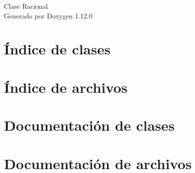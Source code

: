 \documentclass[twoside]{book}
\newcommand{\+}{\discretionary{\mbox{\scriptsize$\hookleftarrow$}}{}{}}
\newcommand{\clearemptydoublepage}{%
    \newpage{\pagestyle{empty}\cleardoublepage}%
  }
\begin{document}
  \raggedbottom
  \begin{titlepage}
  \vspace*{7cm}
  \begin{center}%
  {\Large Clase Racional}\\
  \vspace*{1cm}
  {\large Generado por Doxygen 1.12.0}\\
  \end{center}
  \end{titlepage}
  \clearemptydoublepage
  \tableofcontents
  \clearemptydoublepage

\chapter{Índice de clases}

\chapter{Índice de archivos}

\chapter{Documentación de clases}

\chapter{Documentación de archivos}


  \backmatter
  \newpage
  \clearemptydoublepage
  \printindex
\end{document}

